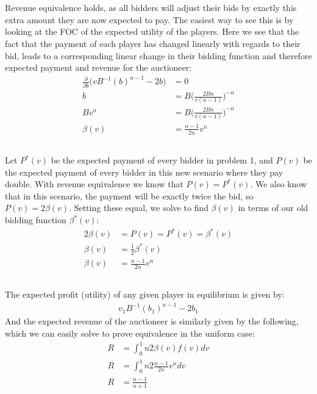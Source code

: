 \documentclass[a4paper,12pt]{article}
\begin{document}
\section{}

\subsection{}
Revenue equivalence holds, as all bidders will adjust their bids by exactly this extra amount they are now expected to pay. The easiest way to see this is by looking at the FOC of the expected utility of the players. Here we see that the fact that the payment of each player has changed linearly with regards to their bid, leads to a corresponding linear change in their bidding function and therefore expected payment and revenue for the auctioneer:  
%
\begin{align*}
\frac{\partial}{\partial b} \bigg( vB^{-1}(b)^{n - 1} - 2b \bigg) &= 0 \\
b &= B\bigg( \frac{2Bn}{v(n - 1)} \bigg)^{-n} \\
Bv^n &= B\bigg( \frac{2Bn}{v(n - 1)} \bigg)^{-n} \\
\beta(v) &= \frac{n-1}{2n}v^n
\end{align*}

\subsection{}
Let $P^*(v)$ be the expected payment of every bidder in problem 1, and $P(v)$ be the expected payment of every bidder in this new scenario where they pay double. With revenue equivalence we know that $P(v) = P^*(v)$. We also know that in this scenario, the payment will be exactly twice the bid, so $P(v) = 2\beta(v)$. Setting these equal, we solve to find $\beta(v)$ in terms of our old bidding function $\beta^*(v)$: 
%
\begin{align*}
2\beta(v) &= P(v) = P^*(v) = \beta^*(v) \\
\beta(v) &= \frac{1}{2}\beta^*(v) \\
\beta(v) &= \frac{n-1}{2n}v^n
\end{align*}
%

\subsection{}
The expected profit (utility) of any given player in equilibrium is given by: 
\begin{align*}
v_1B^{-1}(b_1)^{n - 1} - 2b_1
\end{align*}
%
And the expected revenue of the auctioneer is similarly given by the following, which we can easily solve to prove equivalence in the uniform case: 
%
\begin{align*}
R &= \int_0^1 n 2 \beta(v) f(v) dv \\
R &= \int_0^1 n 2 \frac{n-1}{2n}v^n dv \\
R &= \frac{n-1}{n+1} \\
\end{align*}
%
\end{document}
